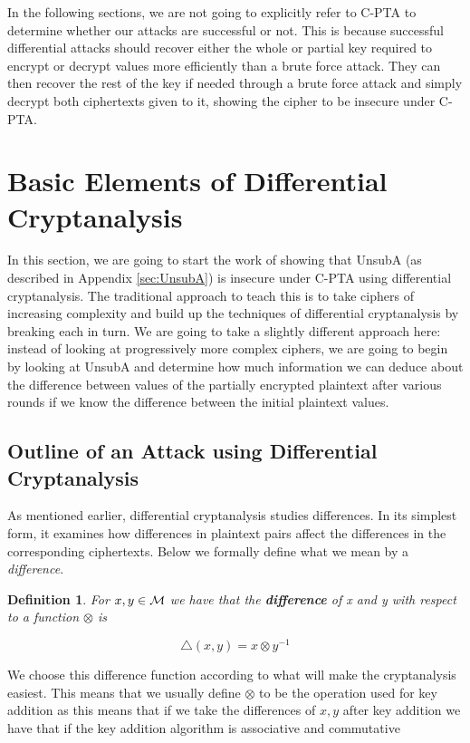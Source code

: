 \documentclass[12pt,a4paper]{article}
\newtheorem{definition}[theorem]{Definition}
\begin{document}
In the following sections, we are not going to explicitly refer to C-PTA to
determine whether our attacks are successful or not. This is because
successful differential attacks should recover either the whole or partial key
required to encrypt or decrypt values more efficiently than a brute force
attack. They can then recover the rest of the key if needed through a brute
force attack and simply decrypt both ciphertexts given to it, showing the
cipher to be insecure under C-PTA.

\newpage
\section{Basic Elements of Differential Cryptanalysis}
\label{sec:analysis}

In this section, we are going to start the work of showing that UnsubA (as
described in Appendix \ref{sec:UnsubA}) is insecure under C-PTA using
differential cryptanalysis.  The traditional approach to teach this is to take
ciphers of increasing complexity and build up the techniques of differential
cryptanalysis by breaking each in turn. We are going to take a slightly
different approach here: instead of looking at progressively more complex
ciphers, we are going to begin by looking at UnsubA and determine how much
information we can deduce about the difference between values of the partially
encrypted plaintext after various rounds if we know the difference between the
initial plaintext values. 

\subsection{Outline of an Attack using Differential Cryptanalysis}
\label{sec:outline_attack}
As mentioned earlier, differential cryptanalysis studies differences. In its
simplest form, it examines
how differences in plaintext pairs affect the differences in the corresponding
ciphertexts. Below we formally define what we mean by a \textit{difference}.

\begin{definition}
For $x,y \in \cal{M}$ we have that the \textbf{difference} of x and y with
respect to a function $\otimes$ is

\[\triangle(x,y) = x \otimes y^{-1}\]
\end{definition}

We choose this difference function according to what will make the cryptanalysis
easiest. This means that we usually define $\otimes$ to be the operation used
for key addition as this means that if we take the differences of $x,y$ after
key addition we have that if the key addition algorithm is associative and
commutative
\end{document}
